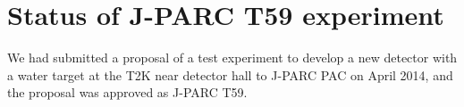 \section{Status of J-PARC T59 experiment}
We had submitted a proposal of a test experiment to develop a new detector with a water target at the T2K near detector hall to J-PARC PAC on April 2014, and the proposal was approved as J-PARC T59.
